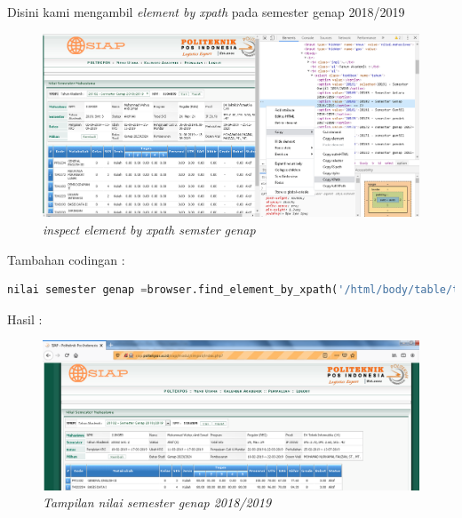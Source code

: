 \begin{enumerate}
Disini kami mengambil \textit{element by xpath} pada semester genap 2018/2019
\begin{figure}[H]
    	\centering
    	\includegraphics[scale=0.3]{figures/semestergenap.png}
    	\caption{\textit{inspect element by xpath semster genap}}
    	\label{CLI}
	\end{figure}

Tambahan codingan :
\begin{lstlisting}[language=Python]
nilai semester genap =browser.find_element_by_xpath('/html/body/table/tbody/tr[5]/td/table[3]/tbody/tr[1]/td[2]/p[1]/table/tbody/tr/td[3]/select/option[4]').click()
\end{lstlisting}

\newpage

Hasil :
\begin{figure}[H]
    	\centering
    	\includegraphics[scale=0.3]{figures/hasilnilai2.png}
    	\caption{\textit{Tampilan nilai semester genap 2018/2019}}
    	\label{CLI}
	\end{figure}




\end{enumerate}
